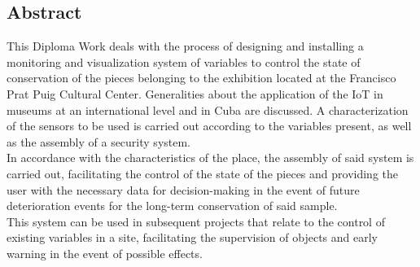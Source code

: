 \begin{center}
    \section*{Abstract}    
\end{center}

This Diploma Work deals with the process of designing and installing a monitoring and visualization system of variables to control the state of conservation of the pieces belonging to the exhibition located at the Francisco Prat Puig Cultural Center. Generalities about the application of the IoT in museums at an international level and in Cuba are discussed. A characterization of the sensors to be used is carried out according to the variables present, as well as the assembly of a security system.\\
In accordance with the characteristics of the place, the assembly of said system is carried out, facilitating the control of the state of the pieces and providing the user with the necessary data for decision-making in the event of future deterioration events for the long-term conservation of said sample.\\
This system can be used in subsequent projects that relate to the control of existing variables in a site, facilitating the supervision of objects and early warning in the event of possible effects.